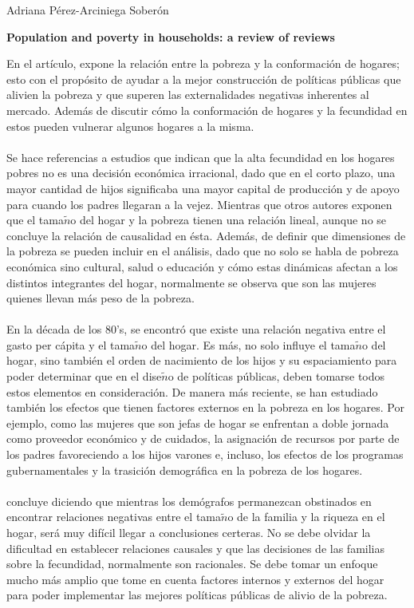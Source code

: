 \documentclass[11pt,spanish,letterpaper]{article}
\theoremstyle{plain}
\begin{document}
\begin{flushleft}
Adriana P\'erez-Arciniega Sober\'on
\end{flushleft}
\begin{center}
\textbf{Population and poverty in households: a review of reviews}
\end{center}
En el art\'iculo, \cite{merrick2001population} expone la relaci\'on entre la pobreza y la conformaci\'on de hogares; esto con el prop\'osito de ayudar a la mejor construcci\'on de pol\'iticas p\'ublicas que alivien la pobreza y que superen las externalidades negativas inherentes al mercado. Adem\'as de discutir c\'omo la conformaci\'on de hogares y la fecundidad en estos pueden vulnerar algunos hogares a la misma.\\
\\
Se hace referencias a estudios que indican que la alta fecundidad en los hogares pobres no es una decisi\'on econ\'omica irracional, dado que en el corto plazo, una mayor cantidad de hijos significaba una mayor capital de producci\'on y de apoyo para cuando los padres llegaran a la vejez. Mientras que otros autores exponen que el tama$\tilde{n}$o del hogar y la pobreza tienen una relaci\'on lineal, aunque no se concluye la relaci\'on de causalidad en \'esta. Adem\'as, de definir que dimensiones de la pobreza se pueden incluir en el an\'alisis, dado que no solo se habla de pobreza econ\'omica sino cultural, salud o educaci\'on y c\'omo estas din\'amicas afectan a los distintos integrantes del hogar, normalmente se observa que son las mujeres quienes llevan m\'as peso de la pobreza.\\
\\
En la d\'ecada de los 80's, se encontr\'o que existe una relaci\'on negativa entre el gasto per c\'apita y el tama$\tilde{n}$o del hogar. Es m\'as, no solo influye el tama$\tilde{n}$o del hogar, sino tambi\'en el orden de nacimiento de los hijos y su espaciamiento para poder determinar que en el dise$\tilde{n}$o de pol\'iticas p\'ublicas, deben tomarse todos estos elementos en consideraci\'on. De manera m\'as reciente, se han estudiado tambi\'en los efectos que tienen factores externos en la pobreza en los hogares. Por ejemplo, como las mujeres que son jefas de hogar se enfrentan a doble jornada como proveedor econ\'omico y de cuidados, la asignaci\'on de recursos por parte de los padres favoreciendo a los hijos varones e, incluso, los efectos de los programas gubernamentales y la trasici\'on demogr\'afica en la pobreza de los hogares.\\
\\
\cite{merrick2001population} concluye diciendo que mientras los dem\'ografos permanezcan obstinados en encontrar relaciones negativas entre el tama$\tilde{n}$o de la familia y la riqueza en el hogar, ser\'a muy dif\'icil llegar a conclusiones certeras. No se debe olvidar la dificultad en establecer relaciones causales y que las decisiones de las familias sobre la fecundidad, normalmente son racionales. Se debe tomar un enfoque mucho m\'as amplio que tome en cuenta factores internos y externos del hogar para poder implementar las mejores pol\'iticas p\'ublicas de alivio de la pobreza.


\end{document}
